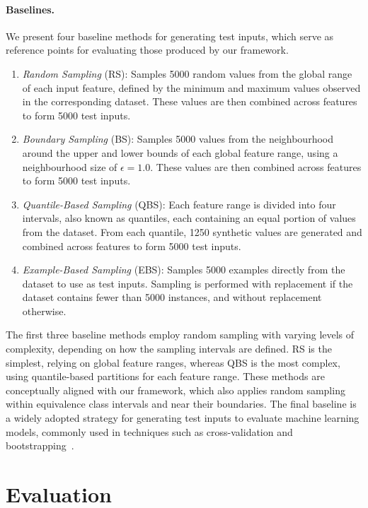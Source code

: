 \documentclass[
]{ceurart}
\theoremstyle{definition}
\begin{document}
\paragraph{Baselines.} We present four baseline methods for generating test inputs, which serve as reference points for evaluating those produced by our framework.
\begin{enumerate}
\item \textit{Random Sampling} (RS): Samples 5000 random values from the global range of each input feature, defined by the minimum and maximum values observed in the corresponding dataset. These values are then combined across features to form 5000 test inputs.
\item \textit{Boundary Sampling} (BS): Samples 5000 values from the neighbourhood around the upper and lower bounds of each global feature range, using a neighbourhood size of $\epsilon = 1.0$. These values are then combined across features to form 5000 test inputs. 
\item \textit{Quantile-Based Sampling} (QBS): Each feature range is divided into four intervals, also known as quantiles, each containing an equal portion of values from the dataset. From each quantile, 1250 synthetic values are generated and combined across features to form 5000 test inputs.
\item \textit{Example-Based Sampling} (EBS): Samples 5000 examples directly from the dataset to use as test inputs. Sampling is performed with replacement if the dataset contains fewer than 5000 instances, and without replacement otherwise.
\end{enumerate}

The first three baseline methods employ random sampling with varying levels of complexity, depending on how the sampling intervals are defined. RS is the simplest, relying on global feature ranges, whereas QBS is the most complex, using quantile-based partitions for each feature range. These methods are conceptually aligned with our framework, which also applies random sampling within equivalence class intervals and near their boundaries. The final baseline is a widely adopted strategy for generating test inputs to evaluate machine learning models, commonly used in techniques such as cross-validation and bootstrapping~\cite{durelli}.

\section{Evaluation}
\label{sec:res}
\end{document}
